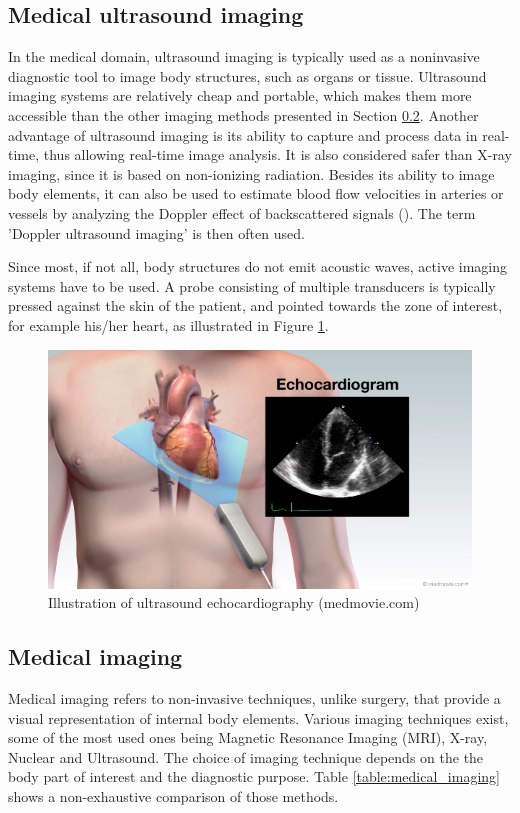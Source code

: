 \subsection{Medical ultrasound imaging}
In the medical domain, ultrasound imaging is typically used as a noninvasive diagnostic tool to image body structures, such as organs or tissue. Ultrasound imaging systems are relatively cheap and portable, which makes them more accessible than the other imaging methods presented in Section \ref{sec:medical_imaging}.
Another advantage of ultrasound imaging is its ability to capture and process data in real-time, thus allowing real-time image analysis.
It is also considered safer than X-ray imaging, since it is based on non-ionizing radiation.
Besides its ability to image body elements, it can also be used to estimate blood flow velocities in arteries or vessels by analyzing the Doppler effect of backscattered signals (\cite{doppler_ultrasound}). The term 'Doppler ultrasound imaging' is then often used.

Since most, if not all, body structures do not emit acoustic waves, active imaging systems have to be used. A probe consisting of multiple transducers is typically pressed against the skin of the patient, and pointed towards the zone of interest, for example his/her heart, as illustrated in Figure \ref{fig:echocardiography}.

\begin{figure}[ht]
    \includegraphics[width=\linewidth]{./images/background/echocardiogram.png}
	\caption{Illustration of ultrasound echocardiography (medmovie.com)}
	\label{fig:echocardiography}
\end{figure}

\subsection{Medical imaging}
\label{sec:medical_imaging}
Medical imaging refers to non-invasive techniques, unlike surgery, that provide a visual representation of internal body elements. Various imaging techniques exist, some of the most used ones being Magnetic Resonance Imaging (MRI), X-ray, Nuclear and Ultrasound. 
The choice of imaging technique depends on the the body part of interest and the diagnostic purpose. Table \ref{table:medical_imaging} shows a non-exhaustive comparison of those methods.

